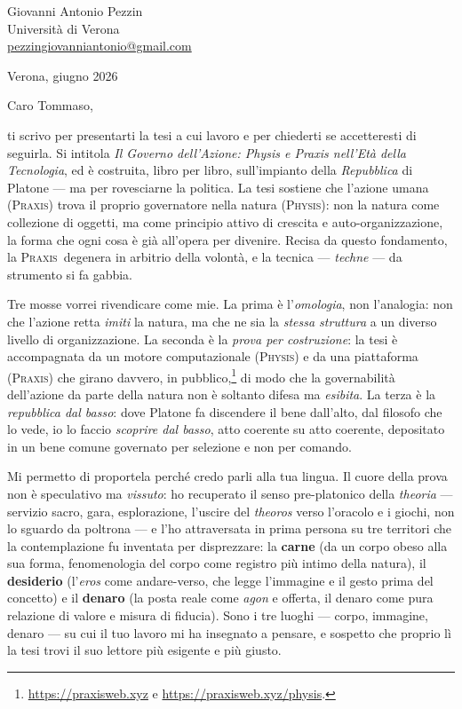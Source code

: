 \documentclass[11pt,a4paper]{article}
\newcommand{\physis}{\textsc{Physis}\xspace}
\newcommand{\praxis}{\textsc{Praxis}\xspace}
\begin{document}
\noindent Giovanni Antonio Pezzin \\
Universit\`a di Verona \\
\href{mailto:pezzingiovanniantonio@gmail.com}{pezzingiovanniantonio@gmail.com}

\vspace{1em}
\noindent Verona, giugno 2026

\vspace{2em}
\noindent Caro Tommaso,

\vspace{0.5em}

ti scrivo per presentarti la tesi a cui lavoro e per chiederti se accetteresti di
seguirla. Si intitola \emph{Il Governo dell'Azione: Physis e Praxis nell'Et\`a della
Tecnologia}, ed \`e costruita, libro per libro, sull'impianto della \emph{Repubblica}
di Platone --- ma per rovesciarne la politica. La tesi sostiene che l'azione umana
(\praxis) trova il proprio governatore nella natura (\physis): non la natura come
collezione di oggetti, ma come principio attivo di crescita e auto-organizzazione, la
forma che ogni cosa \`e gi\`a all'opera per divenire. Recisa da questo fondamento, la
\praxis\ degenera in arbitrio della volont\`a, e la tecnica --- \emph{techne} --- da
strumento si fa gabbia.

Tre mosse vorrei rivendicare come mie. La prima \`e l'\emph{omologia}, non l'analogia:
non che l'azione retta \emph{imiti} la natura, ma che ne sia la \emph{stessa
struttura} a un diverso livello di organizzazione. La seconda \`e la \emph{prova per
costruzione}: la tesi \`e accompagnata da un motore computazionale (\physis) e da una
piattaforma (\praxis) che girano davvero, in pubblico,\footnote{\url{https://praxisweb.xyz}
e \url{https://praxisweb.xyz/physis}.} di modo che la governabilit\`a dell'azione da
parte della natura non \`e soltanto difesa ma \emph{esibita}. La terza \`e la
\emph{repubblica dal basso}: dove Platone fa discendere il bene dall'alto, dal filosofo
che lo vede, io lo faccio \emph{scoprire dal basso}, atto coerente su atto coerente,
depositato in un bene comune governato per selezione e non per comando.

Mi permetto di proportela perch\'e credo parli alla tua lingua. Il cuore della prova
non \`e speculativo ma \emph{vissuto}: ho recuperato il senso pre-platonico della
\emph{theoria} --- servizio sacro, gara, esplorazione, l'uscire del \emph{theoros}
verso l'oracolo e i giochi, non lo sguardo da poltrona --- e l'ho attraversata in
prima persona su tre territori che la contemplazione fu inventata per disprezzare: la
\textbf{carne} (da un corpo obeso alla sua forma, fenomenologia del corpo come registro
pi\`u intimo della natura), il \textbf{desiderio} (l'\emph{eros} come andare-verso, che
legge l'immagine e il gesto prima del concetto) e il \textbf{denaro} (la posta reale
come \emph{agon} e offerta, il denaro come pura relazione di valore e misura di
fiducia). Sono i tre luoghi --- corpo, immagine, denaro --- su cui il tuo lavoro mi ha
insegnato a pensare, e sospetto che proprio l\`i la tesi trovi il suo lettore pi\`u
esigente e pi\`u giusto.
\end{document}
